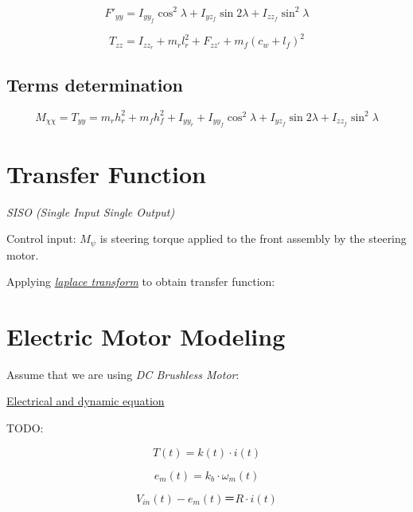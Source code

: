 \documentclass[11pt]{article}
\begin{document}
\begin{equation}
    F'_{yy} = I_{yy_f}\cos^2\lambda + I_{yz_f}\sin2\lambda + I_{zz_f}\sin^2\lambda
\end{equation}

\begin{equation}
    T_{zz} = I_{zz_{r}} + m_r l^2_{r} + F_{zz'} + m_f(c_w + l_f)^2
\end{equation}

\subsection{Terms determination}
\begin{equation}
    M_{\chi\chi} = T_{yy} =  m_r h^2_r + m_fh^2_f + I_{yy_r} + I_{yy_f}\cos^2\lambda + I_{yz_f}\sin2\lambda + I_{zz_f}\sin^2\lambda
\end{equation}

\section{Transfer Function}

{\em SISO (Single Input Single Output)}

Control input:
$M_{\psi}$ is steering torque applied to the front assembly by the steering motor.

Applying {\em \href{http://tutorial.math.lamar.edu/pdf/Laplace_Table.pdf}{laplace transform}} to obtain transfer function:

\section{Electric Motor Modeling}

Assume that we are using {\em DC Brushless Motor}:

\href{http://ctms.engin.umich.edu/CTMS/index.php?example=MotorSpeed&section=SystemModeling#3}{Electrical and dynamic equation}

TODO:

\begin{equation}
    T(t) = k(t) \cdot i(t)
\end{equation}

\begin{equation}
    e_{m}(t) = k_{b} \cdot \omega_{m}(t)
\end{equation}

\begin{equation}
    V_{in}(t) - e_{m}(t) ＝ R \cdot i(t)
\end{equation}
\end{document}
